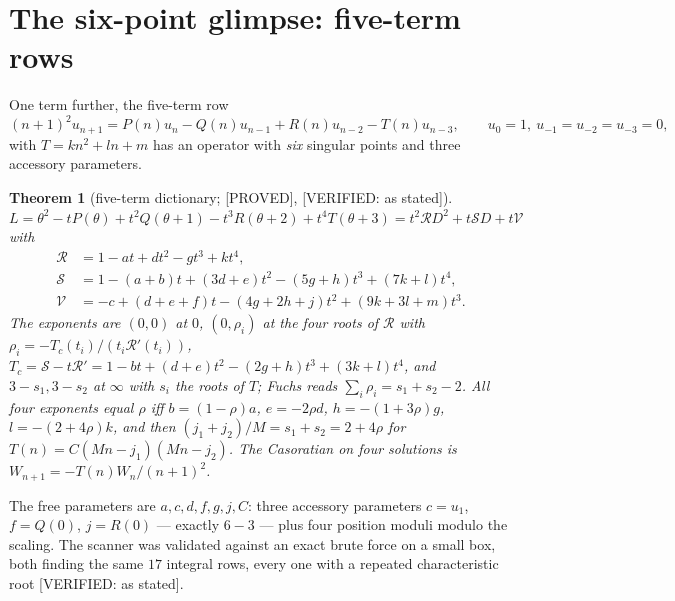 \documentclass[11pt,reqno]{amsart}
\theoremstyle{plain}
\newtheorem{theorem}{Theorem}[section]
\theoremstyle{definition}
\theoremstyle{remark}
\theoremstyle{plain}
\newcommand{\Rc}{\mathcal R}
\newcommand{\Sc}{\mathcal S}
\newcommand{\Vc}{\mathcal V}
\newcommand{\Proved}{\textup{\textsf{[PROVED]}}}
\newcommand{\Verified}[1]{\textup{\textsf{[VERIFIED: #1]}}}
\begin{document}
\section{The six-point glimpse: five-term rows}\label{sec:sixpoint}

One term further, the five-term row
\[
(n+1)^2u_{n+1}=P(n)u_n-Q(n)u_{n-1}+R(n)u_{n-2}-T(n)u_{n-3},
\qquad u_0=1,\ u_{-1}=u_{-2}=u_{-3}=0,
\]
with $T=kn^2+ln+m$ has an operator with \emph{six} singular points and three
accessory parameters.

\begin{theorem}[five-term dictionary; \Proved, \Verified{as stated}]\label{thm:D5}
$L=\theta^2-tP(\theta)+t^2Q(\theta+1)-t^3R(\theta+2)+t^4T(\theta+3)
 =t^2\Rc D^2+t\Sc D+t\Vc$ with
\[
\begin{aligned}
\Rc&=1-at+dt^2-gt^3+kt^4,\\
\Sc&=1-(a+b)t+(3d+e)t^2-(5g+h)t^3+(7k+l)t^4,\\
\Vc&=-c+(d+e+f)t-(4g+2h+j)t^2+(9k+3l+m)t^3 .
\end{aligned}
\]
The exponents are $(0,0)$ at $0$, $(0,\rho_i)$ at the four roots of $\Rc$ with
$\rho_i=-T_c(t_i)/(t_i\Rc'(t_i))$,
$T_c=\Sc-t\Rc'=1-bt+(d+e)t^2-(2g+h)t^3+(3k+l)t^4$, and $3-s_1,3-s_2$ at $\infty$
with $s_i$ the roots of $T$; Fuchs reads $\sum_i\rho_i=s_1+s_2-2$. All four
exponents equal $\rho$ iff $b=(1-\rho)a$, $e=-2\rho d$, $h=-(1+3\rho)g$,
$l=-(2+4\rho)k$, and then $(j_1+j_2)/M=s_1+s_2=2+4\rho$ for
$T(n)=C(Mn-j_1)(Mn-j_2)$. The Casoratian on four solutions is
$W_{n+1}=-T(n)W_n/(n+1)^2$.
\end{theorem}

The free parameters are $a,c,d,f,g,j,C$: three accessory parameters $c=u_1$,
$f=Q(0)$, $j=R(0)$ --- exactly $6-3$ --- plus four position moduli modulo the
scaling. The scanner was validated against an exact brute force on a small box,
both finding the same $17$ integral rows, every one with a repeated
characteristic root \Verified{as stated}.
\end{document}

